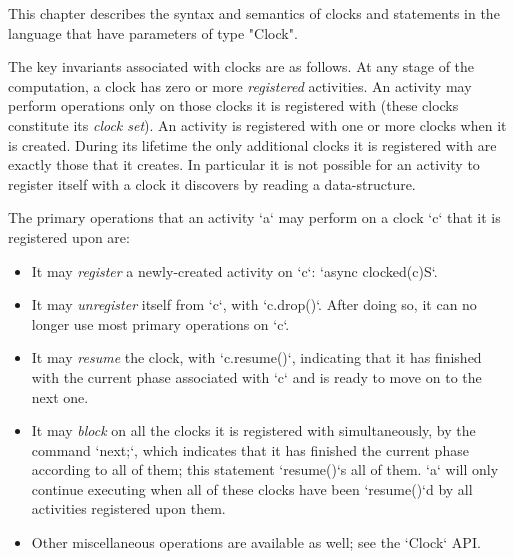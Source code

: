 This chapter describes the syntax and semantics of clocks and
statements in the language that have parameters of type \xcd"Clock". 

The key invariants associated with clocks are as follows.  At any
stage of the computation, a clock has zero or more {\em registered}
activities. An activity may perform operations only on those clocks it
is registered with (these clocks constitute its {\em clock set}).  An
activity is registered with one or more clocks when it is created.
During its lifetime the only additional clocks it is registered with
are exactly those that it creates. In particular it is not possible
for an activity to register itself with a clock it discovers by
reading a data-structure.

The primary operations that an activity \xcd`a` may perform on a clock \xcd`c`
that it is registered upon are: 
\begin{itemize}
\item It may {\em register} a newly-created activity on \xcd`c`: 
      \xcd`async clocked(c){S}`.
\item It may {\em unregister} itself from \xcd`c`, with \xcd`c.drop()`.  After
      doing so, it can no longer use most primary operations on \xcd`c`.
\item It may {\em resume} the clock, with \xcd`c.resume()`, indicating that it
      has finished with the current phase associated with \xcd`c` and is ready
      to move on to the next one.
\item It may {\em block} on all the clocks it is registered with
      simultaneously, by the command \xcd`next;`, which indicates that it 
      has finished the current phase according to all of them; this statement 
      \xcd`resume()`s all of them. \xcd`a` will only continue executing when
      all of these clocks have been \xcd`resume()`d by all activities
      registered upon them.
\item Other miscellaneous operations are available as well; see the
      \xcd`Clock` API.
\end{itemize}


